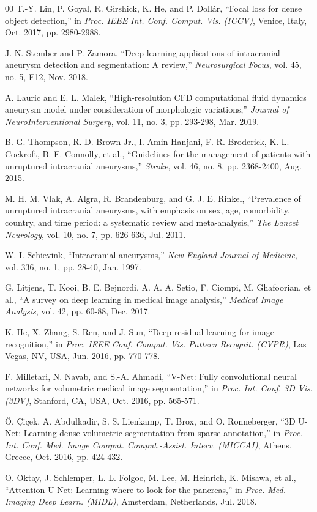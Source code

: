 \documentclass[conference]{IEEEtran}
\begin{document}
\begin{thebibliography}{00}
 T.-Y. Lin, P. Goyal, R. Girshick, K. He, and P. Dollár, ``Focal loss for dense object detection,'' in \textit{Proc. IEEE Int. Conf. Comput. Vis. (ICCV)}, Venice, Italy, Oct. 2017, pp. 2980-2988.

 J. N. Stember and P. Zamora, ``Deep learning applications of intracranial aneurysm detection and segmentation: A review,'' \textit{Neurosurgical Focus}, vol. 45, no. 5, E12, Nov. 2018.

 A. Lauric and E. L. Malek, ``High-resolution CFD computational fluid dynamics aneurysm model under consideration of morphologic variations,'' \textit{Journal of NeuroInterventional Surgery}, vol. 11, no. 3, pp. 293-298, Mar. 2019.

 B. G. Thompson, R. D. Brown Jr., I. Amin-Hanjani, F. R. Broderick, K. L. Cockroft, B. E. Connolly, et al., ``Guidelines for the management of patients with unruptured intracranial aneurysms,'' \textit{Stroke}, vol. 46, no. 8, pp. 2368-2400, Aug. 2015.

 M. H. M. Vlak, A. Algra, R. Brandenburg, and G. J. E. Rinkel, ``Prevalence of unruptured intracranial aneurysms, with emphasis on sex, age, comorbidity, country, and time period: a systematic review and meta-analysis,'' \textit{The Lancet Neurology}, vol. 10, no. 7, pp. 626-636, Jul. 2011.

 W. I. Schievink, ``Intracranial aneurysms,'' \textit{New England Journal of Medicine}, vol. 336, no. 1, pp. 28-40, Jan. 1997.

 G. Litjens, T. Kooi, B. E. Bejnordi, A. A. A. Setio, F. Ciompi, M. Ghafoorian, et al., ``A survey on deep learning in medical image analysis,'' \textit{Medical Image Analysis}, vol. 42, pp. 60-88, Dec. 2017.

 K. He, X. Zhang, S. Ren, and J. Sun, ``Deep residual learning for image recognition,'' in \textit{Proc. IEEE Conf. Comput. Vis. Pattern Recognit. (CVPR)}, Las Vegas, NV, USA, Jun. 2016, pp. 770-778.

 F. Milletari, N. Navab, and S.-A. Ahmadi, ``V-Net: Fully convolutional neural networks for volumetric medical image segmentation,'' in \textit{Proc. Int. Conf. 3D Vis. (3DV)}, Stanford, CA, USA, Oct. 2016, pp. 565-571.

 Ö. Çiçek, A. Abdulkadir, S. S. Lienkamp, T. Brox, and O. Ronneberger, ``3D U-Net: Learning dense volumetric segmentation from sparse annotation,'' in \textit{Proc. Int. Conf. Med. Image Comput. Comput.-Assist. Interv. (MICCAI)}, Athens, Greece, Oct. 2016, pp. 424-432.

 O. Oktay, J. Schlemper, L. L. Folgoc, M. Lee, M. Heinrich, K. Misawa, et al., ``Attention U-Net: Learning where to look for the pancreas,'' in \textit{Proc. Med. Imaging Deep Learn. (MIDL)}, Amsterdam, Netherlands, Jul. 2018.

\end{thebibliography}
\end{document}
